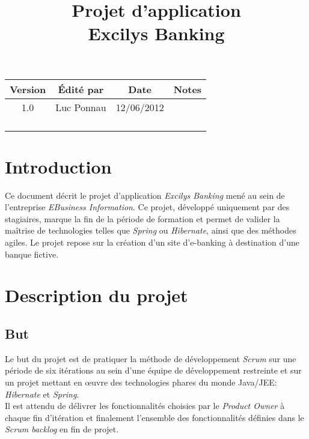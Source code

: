 \documentclass[11pt]{article}
\title{Projet d'application\\Excilys Banking}
\date{}
\begin{document}
\maketitle

\begin{center}
\begin{tabular}{ | c | c | c | c | }
\hline \textbf{Version} & \textbf{Édité par} & \textbf{Date} & \textbf{Notes} \\
\hline 1.0 & Luc Ponnau & 12/06/2012 &  \\
\hline & & & \\
\hline & & & \\
\hline & & & \\
\hline & & & \\ \hline
\end{tabular}
\end{center}

\section{Introduction}

Ce document décrit le projet d'application \emph{Excilys Banking} mené au sein
de l'entreprise \emph{EBusiness Information}. Ce projet, développé uniquement
par des stagiaires, marque la fin de la période de formation et permet de
valider la maîtrise de technologies telles que \emph{Spring} ou \emph{Hibernate},
ainsi que des méthodes agiles. Le projet repose sur la création d'un site
d'e-banking à destination d'une banque fictive.

\section{Description du projet}

\subsection{But}

Le but du projet est de pratiquer la méthode de développement \emph{Scrum} sur
une période de six itérations au sein d'une équipe de développement
restreinte et sur un projet mettant en \oe{}uvre
des technologies phares du monde Java/JEE: \emph{Hibernate} et \emph{Spring}.\\

Il est attendu de délivrer les fonctionnalités choisies par le \emph{Product Owner}
à chaque fin d'itération et finalement l'ensemble des fonctionnalités définies
dans le \emph{Scrum backlog} en fin de projet.\\
\end{document}
